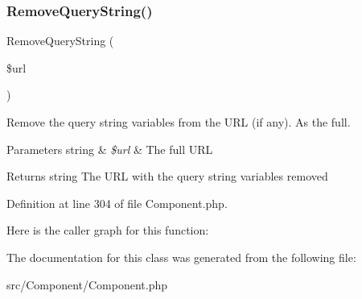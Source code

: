 \subsubsection{\texorpdfstring{Remove\+Query\+String()}{RemoveQueryString()}}
{\footnotesize\ttfamily Remove\+Query\+String (\begin{DoxyParamCaption}\item[{}]{\$url }\end{DoxyParamCaption})\hspace{0.3cm}{\ttfamily [protected]}}

Remove the query string variables from the U\+RL (if any). As the full.


\begin{DoxyParams}[1]{Parameters}
string & {\em \$url} & The full U\+RL\\
\hline
\end{DoxyParams}
\begin{DoxyReturn}{Returns}
string The U\+RL with the query string variables removed 
\end{DoxyReturn}


Definition at line 304 of file Component.\+php.

Here is the caller graph for this function\+:


The documentation for this class was generated from the following file\+:\begin{DoxyCompactItemize}
\item 
src/\+Component/Component.\+php\end{DoxyCompactItemize}
